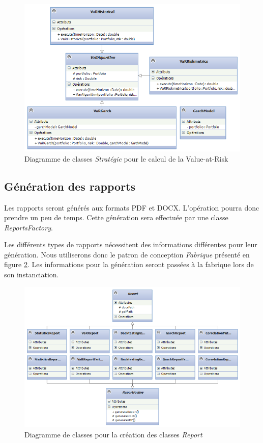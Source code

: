 \documentclass[a4paper,titlepage,french]{report}
\begin{document}
\begin{figure}
  	\center
  	\includegraphics[width=1\textwidth]{diagramme-classes-var-strategy.png}
  	\caption{Diagramme de classes \textit{Stratégie} pour le calcul de la Value-at-Risk}
  	\label{fig:diagramme-classes-var-strategy}
\end{figure}


\subsection{Génération des rapports}

Les rapports seront générés aux formats PDF et DOCX.
L'opération pourra donc prendre un peu de temps.
Cette génération sera effectuée par une classe \textit{ReportsFactory}.

Les différents types de rapports nécessitent des informations différentes pour leur génération.
Nous utiliserons donc le patron de conception \textit{Fabrique} présenté en figure \ref{fig:diagramme-classes-reports-factory}.
Les informations pour la génération seront passées à la fabrique lors de son instanciation.

\begin{figure}
  	\center
  	\includegraphics[width=1\textwidth]{diagramme-classes-reports-factory.png}
  	\caption{Diagramme de classes pour la création des classes \textit{Report}}
  	\label{fig:diagramme-classes-reports-factory}
\end{figure}
\end{document}
